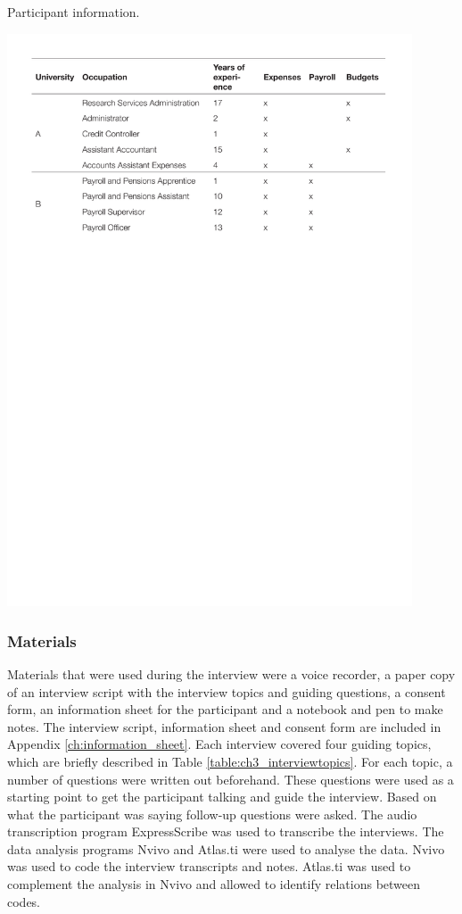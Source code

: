 \begin{table}
\caption{Participant information.}
\centering
\includegraphics[width=0.9\textwidth]{images/ch12/Study1-Table1.pdf}
\vspace{-3pt}
\label{tbl:ch12-Table1}
\end{table}

\subsubsection{Materials}
Materials that were used during the interview were a voice recorder, a paper copy of an interview script with the interview topics and guiding questions, a consent form, an information sheet for the participant and a notebook and pen to make notes. The interview script, information sheet and consent form are included in Appendix \ref{ch:information_sheet}.
Each interview covered four guiding topics, which are briefly described in Table \ref{table:ch3_interviewtopics}. For each topic, a number of questions were written out beforehand. These questions were used as a starting point to get the participant talking and guide the interview. Based on what the participant was saying follow-up questions were asked. The audio transcription program ExpressScribe was used to transcribe the interviews. The data analysis programs Nvivo and Atlas.ti were used to analyse the data. Nvivo was used to code the interview transcripts and notes. Atlas.ti was used to complement the analysis in Nvivo and allowed to identify relations between codes.

